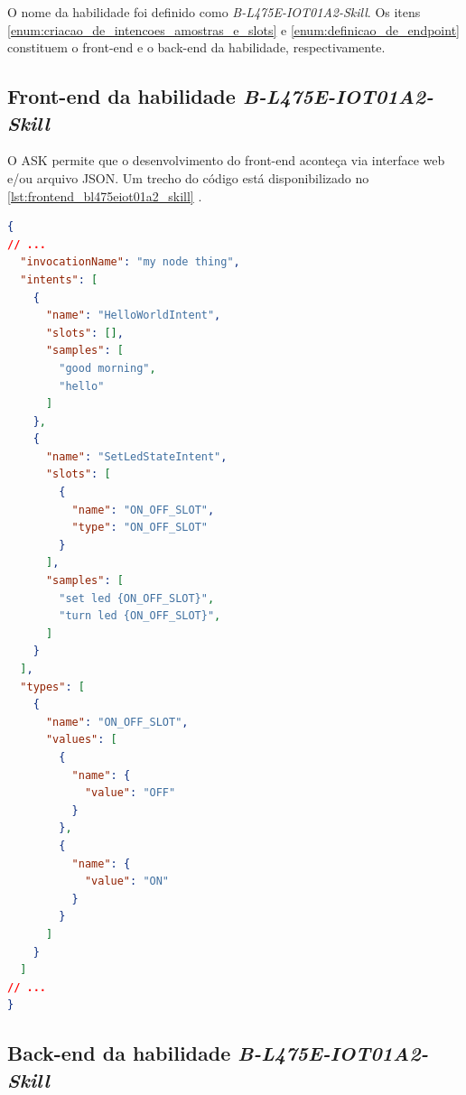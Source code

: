 O nome da habilidade foi definido como \textit{B-L475E-IOT01A2-Skill}. Os itens \autoref{enum:criacao_de_intencoes_amostras_e_slots} e \autoref{enum:definicao_de_endpoint} constituem o front-end e o back-end da habilidade, respectivamente.

\subsection{Front-end da habilidade \textit{B-L475E-IOT01A2-Skill}}\label{subscrion:frontend_bl475eiot01a2_skill}

O ASK permite que o desenvolvimento do front-end aconteça via interface web e/ou arquivo JSON. Um trecho do código está disponibilizado no \autoref{lst:frontend_bl475eiot01a2_skill} \cite{ref:043}.

\begin{lstlisting}[float=htbp,language=json,firstnumber=1,caption={Trecho do arquivo JSON que descreve o front-end da habilidade \textit{B-L475E-IOT01A2-Skill}.},label=lst:frontend_bl475eiot01a2_skill]
{
// ...
  "invocationName": "my node thing",
  "intents": [
    {
      "name": "HelloWorldIntent",
      "slots": [],
      "samples": [
        "good morning",
        "hello"
      ]
    },
    {
      "name": "SetLedStateIntent",
      "slots": [
        {
          "name": "ON_OFF_SLOT",
          "type": "ON_OFF_SLOT"
        }
      ],
      "samples": [
        "set led {ON_OFF_SLOT}",
        "turn led {ON_OFF_SLOT}",
      ]
    }
  ],
  "types": [
    {
      "name": "ON_OFF_SLOT",
      "values": [
        {
          "name": {
            "value": "OFF"
          }
        },
        {
          "name": {
            "value": "ON"
          }
        }
      ]
    }
  ]
// ...
}
\end{lstlisting}

\subsection{Back-end da habilidade \textit{B-L475E-IOT01A2-Skill}}\label{subscrion:backend_bl475eiot01a2_skill}

